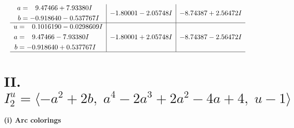 \documentclass[1p]{elsarticle_modified}
\theoremstyle{definition}
\begin{document}
$$\begin{array}{c|c|c}
\begin{aligned}
a &= \phantom{-}9.47466 + 7.93380 I \\
b &= -0.918640 - 0.537767 I\end{aligned}
 & -1.80001 - 2.05748 I & -8.74387 + 2.56472 I \\ \hline\begin{aligned}
u &= \phantom{-}0.1016190 - 0.0298609 I \\
a &= \phantom{-}9.47466 - 7.93380 I \\
b &= -0.918640 + 0.537767 I\end{aligned}
 & -1.80001 + 2.05748 I & -8.74387 - 2.56472 I\\
 \hline 
 \end{array}$$\newpage\newpage\renewcommand{\arraystretch}{1}
\centering \section*{II. $I^u_{2}= \langle - a^2+2 b,\;a^4-2 a^3+2 a^2-4 a+4,\;u-1 \rangle$}
\flushleft \textbf{(i) Arc colorings}\\
\end{document}
